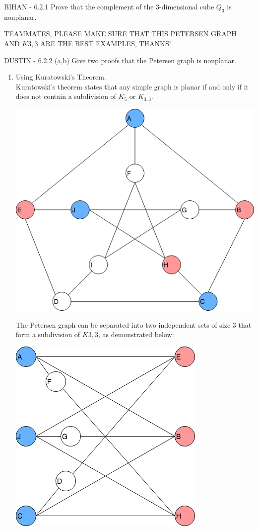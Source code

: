 \documentclass[12pt]{article}
\newenvironment{question}[2][Question]{\begin{trivlist}
\item[\hskip \labelsep {\bfseries #1}\hskip \labelsep {\bfseries #2.}]}{\end{trivlist}}
\begin{document}
\begin{question}{4} - \color{blue}BIHAN\color{black} - 
6.2.1  Prove that the complement of the 3-dimensional cube $Q_3$ is nonplanar.
\end{question}
\large\color{red}TEAMMATES, PLEASE MAKE SURE THAT THIS PETERSEN GRAPH AND $K{3,3}$ ARE THE BEST EXAMPLES, THANKS!
\color{black}\ \normalsize
\begin{question}{5}  - \color{blue}DUSTIN\color{black} - 
6.2.2 (a,b) Give two proofs that the Petersen graph is nonplanar.
\begin{enumerate}[label=\alph*)]
  \item Using Kuratowski's Theorem.   \\
  Kuratowski's theorem states that any simple graph is planar if and only if it does not contain a subdivision of $K_5$ or $K_{3,3}$.
  \begin{center}
    \includegraphics[scale=.45]{petersen}
  \end{center}
  The Petersen graph can be separated into two independent sets of size 3 that form a subdivision of $K{3,3}$, as demonstrated below:
  \begin{center}
    \includegraphics[scale=.45]{k33}

\end{center}
\end{enumerate}
\end{question}
\end{document}
